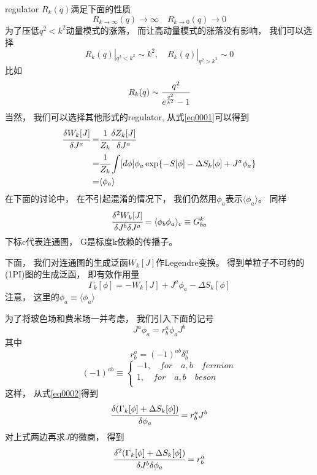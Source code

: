 \documentclass[UTF8]{ctexart}
\begin{document}
regulator $R_k(q)$满足下面的性质
\begin{equation}
R_{k\rightarrow\infty}(q)\rightarrow\infty
\quad
R_{k\rightarrow 0}(q)\rightarrow 0
\end{equation}
为了压低$q^2<k^2$动量模式的涨落，
而让高动量模式的涨落没有影响，
我们可以选择
\begin{equation}
R_k(q)|_{q^2<k^2}\sim k^2,
\quad
R_k(q)|_{q^2>k^2}\sim 0
\end{equation}
比如
\begin{equation}
R_k(q)\sim\cfrac{q^2}{e^{\frac{q^2}{k^2}}-1}
\end{equation}
当然，
我们可以选择其他形式的regulator,
从式\eqref{eq0001}可以得到
\begin{equation}
\begin{split}
\cfrac{\delta W_k[J]}{\delta J^a}=&\cfrac{1}{Z_k}
\cfrac{\delta Z_k[J]}{\delta J^a}\\
=&\cfrac{1}{Z_k}\int [d\phi]\phi_a\exp\{-S[\phi]
-\Delta S_k[\phi]+J^a\phi_a\}\\
=&\langle\phi_a\rangle
\end{split}
\end{equation}
在下面的讨论中，
在不引起混淆的情况下，
我们仍然用$\phi_a$表示$\langle\phi_a\rangle$。
同样
\begin{equation}
\cfrac{\delta^2W_k[J]}{\delta J^b\delta J^a}
=\langle \phi_b\phi_a\rangle_c\equiv G_{ba}^k
\end{equation}
下标c代表连通图，
G是标度k依赖的传播子。

下面，
我们对连通图的生成泛函$W_k[J]$作Legendre变换。
得到单粒子不可约的(1PI)图的生成泛函，
即有效作用量
\begin{equation}\label{eq0002}
\Gamma_k[\phi]=-W_k[J]+J^a\phi_a-\Delta S_k[\phi]
\end{equation}
注意，
这里的$\phi_a\equiv\langle\phi_a\rangle$

为了将玻色场和费米场一并考虑，
我们引入下面的记号
\begin{equation}
J^a\phi_a=r_b^a\phi_aJ^b
\end{equation}
其中
\begin{equation}
r_b^a=(-1)^{ab}\delta_b^a
\end{equation}
\begin{equation}
(-1)^{ab}\equiv
\begin{cases}
-1,\quad for \quad a,b \quad fermion\\
1,\quad for \quad a,b \quad beson\\
\end{cases}
\end{equation}
这样，
从式\eqref{eq0002}得到
\begin{equation}
\cfrac{\delta(\Gamma_k[\phi]+\Delta S_k[\phi])}{\delta\phi_a}
=r_b^aJ^b
\end{equation}
对上式两边再求$J$的微商，
得到
\begin{equation}
\cfrac{\delta^2(\Gamma_k[\phi]+\Delta S_k[\phi])}
{\delta J^b\delta\phi_a}
=r_b^a
\end{equation}
\end{document}
